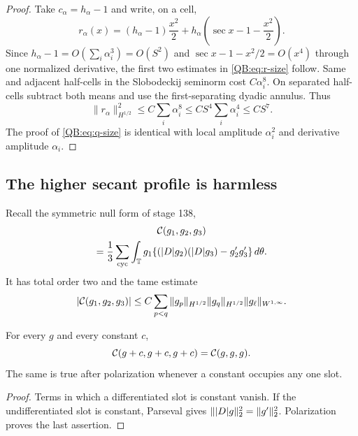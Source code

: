 \begin{proof}
Take $c_\alpha=h_\alpha-1$ and write, on a cell,
\begin{equation*}
 r_\alpha(x)
 =(h_\alpha-1)\frac{x^2}{2}
 +h_\alpha\left(\sec x-1-\frac{x^2}{2}\right).
\end{equation*}
Since $h_\alpha-1=O(\sum_i\alpha_i^3)=O(S^2)$ and
$\sec x-1-x^2/2=O(x^4)$ through one normalized derivative, the first two
estimates in \eqref{QB:eq:r-size} follow.  Same and adjacent half-cells in the
Slobodeckij seminorm cost $C\alpha_i^8$.  On separated half-cells subtract
both means and use the first-separating dyadic annulus.  Thus
\begin{equation*}
 \|r_\alpha\|_{H^{1/2}}^2
 \le C\sum_i\alpha_i^8
 \le CS^4\sum_i\alpha_i^4\le CS^7.
\end{equation*}
The proof of \eqref{QB:eq:q-size} is identical with local amplitude
$\alpha_i^2$ and derivative amplitude $\alpha_i$.
\end{proof}

\subsection{The higher secant profile is harmless}

Recall the symmetric null form of stage 138,
\begin{multline}\label{QB:eq:C}
 \mathcal C(g_1,g_2,g_3)\\
 =\frac13\sum_{\rm cyc}\int_\mathbb T g_1
 \{(|D| g_2)(|D| g_3)-g_2'g_3'\}\,d\theta.
\end{multline}
It has total order two and the tame estimate
\begin{equation}\label{QB:eq:C-tame}
 |\mathcal C(g_1,g_2,g_3)|
 \le C\sum_{p<q}\|g_p\|_{H^{1/2}}\|g_q\|_{H^{1/2}}
 \|g_\ell\|_{W^{1,\infty}}.
\end{equation}

\begin{lemma}
\label{QB:lem:constant}
For every $g$ and every constant $c$,
\begin{equation}\label{QB:eq:constant}
 \mathcal C(g+c,g+c,g+c)=\mathcal C(g,g,g).
\end{equation}
The same is true after polarization whenever a constant occupies any one
slot.
\end{lemma}

\begin{proof}
Terms in which a differentiated slot is constant vanish.  If the
undifferentiated slot is constant, Parseval gives
$\||D| g\|_2^2=\|g'\|_2^2$.  Polarization proves the last assertion.
\end{proof}

